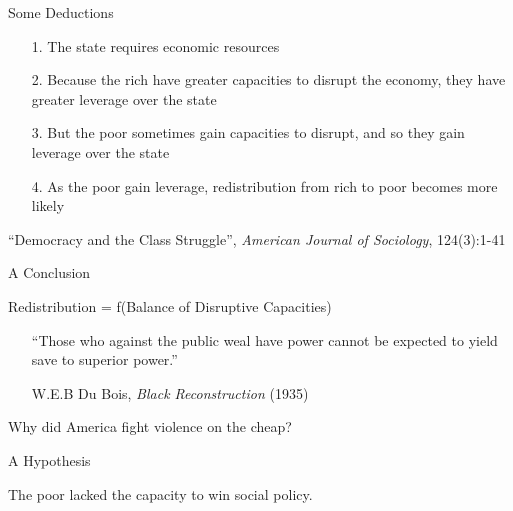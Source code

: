 \documentclass{beamer}
\begin{document}
\begin{frame}{Some Deductions}
\begin{itemize}
    \item[1.] The state requires economic resources
    \item[2.] Because the rich have greater capacities to disrupt the economy, they have greater leverage over the state
    \item[3.] But the poor sometimes gain capacities to disrupt, and so they gain leverage over the state
    \item[4.] As the poor gain leverage, redistribution from rich to poor becomes more likely
\end{itemize}
\begin{flushright}
{\scriptsize ``Democracy and the Class Struggle'', \textit{American Journal of Sociology}, 124(3):1-41}
\end{flushright}
\end{frame}

\begin{frame}{A Conclusion}
\begin{center}
    {\Large Redistribution = \alert{f(Balance of Disruptive Capacities)}}
\end{center}
\end{frame}

\begin{frame}{}
\begin{itemize}
    \item[] ``Those who against the public weal have power cannot be expected to yield save to superior power.'' \\
    \item[] W.E.B Du Bois, \textit{Black Reconstruction} (1935)
\end{itemize}
\end{frame}

\begin{frame}{}
\begin{center}
    {\Large Why did America fight violence on the cheap?}
\end{center}
\end{frame}

\begin{frame}{A Hypothesis}
\begin{center}
    {\Large \alert{The poor lacked the capacity to win social policy.}}
\end{center}
\end{frame}
\end{document}
